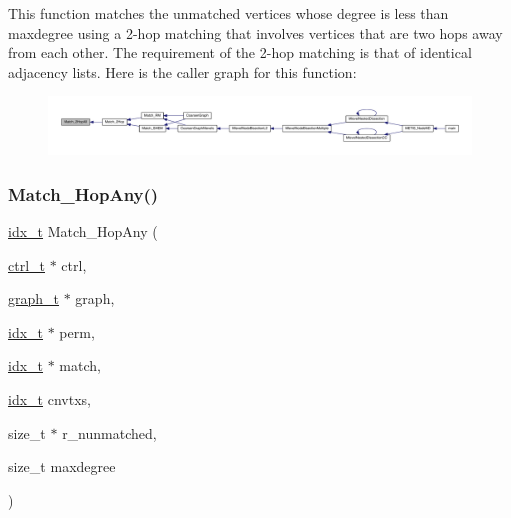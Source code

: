 This function matches the unmatched vertices whose degree is less than maxdegree using a 2-\/hop matching that involves vertices that are two hops away from each other. The requirement of the 2-\/hop matching is that of identical adjacency lists. Here is the caller graph for this function\+:\nopagebreak
\begin{figure}[H]
\begin{center}
\leavevmode
\includegraphics[width=350pt]{a00182_aa56d53cace160be27fb1750dcaffbc04_icgraph}
\end{center}
\end{figure}
\mbox{\label{a00182_a838a4013e3b5cc5278ecc7a8757ce0ef}} 
\subsubsection{\texorpdfstring{Match\+\_\+Hop\+Any()}{Match\_2HopAny()}}
{\footnotesize\ttfamily \hyperlink{a00876_aaa5262be3e700770163401acb0150f52}{idx\+\_\+t} Match\+\_\+Hop\+Any (\begin{DoxyParamCaption}\item[{\hyperlink{a00742}{ctrl\+\_\+t} $\ast$}]{ctrl,  }\item[{\hyperlink{a00734}{graph\+\_\+t} $\ast$}]{graph,  }\item[{\hyperlink{a00876_aaa5262be3e700770163401acb0150f52}{idx\+\_\+t} $\ast$}]{perm,  }\item[{\hyperlink{a00876_aaa5262be3e700770163401acb0150f52}{idx\+\_\+t} $\ast$}]{match,  }\item[{\hyperlink{a00876_aaa5262be3e700770163401acb0150f52}{idx\+\_\+t}}]{cnvtxs,  }\item[{size\+\_\+t $\ast$}]{r\+\_\+nunmatched,  }\item[{size\+\_\+t}]{maxdegree }\end{DoxyParamCaption})}

